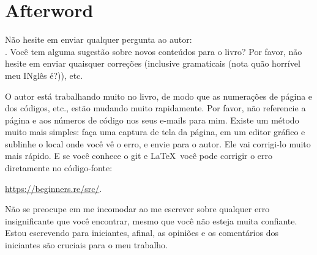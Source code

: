 \part*{Afterword}


Não hesite em enviar qualquer pergunta ao autor: \\
\GTT{\EMAILS}.
Você tem alguma sugestão sobre novos conteúdos para o livro?
Por favor, não hesite em enviar quaisquer correções (inclusive gramaticais (nota quão horrível meu INglês é?)), etc.

O autor está trabalhando muito no livro, de modo que as numerações de página e dos códigos, etc., estão mudando muito rapidamente.
Por favor, não referencie a página e aos números de código nos seus e-mails para mim.
Existe um método muito mais simples: faça uma captura de tela da página, em um editor gráfico e sublinhe o local onde você vê o erro, e envie para o autor. Ele vai corrigi-lo muito mais rápido.
E se você conhece o git e \LaTeX\, você pode corrigir o erro diretamente no código-fonte:

\url{https://beginners.re/src/}.

Não se preocupe em me incomodar ao me escrever sobre qualquer erro insignificante que você encontrar, mesmo que você não esteja muita confiante. Estou escrevendo para iniciantes, afinal, as opiniões e os comentários dos iniciantes são cruciais para o meu trabalho.
